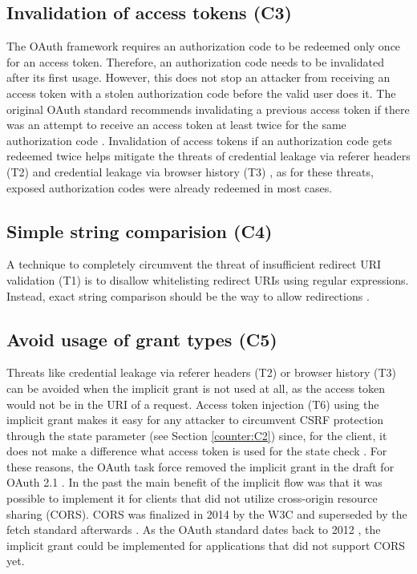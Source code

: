 \documentclass[
    fontsize=12pt,
    headings=small,
    parskip=half,           %
    bibliography=totoc,
    numbers=noenddot,       %
    open=any,               %
    ]{scrreprt}
\begin{document}
\subsection[Invalidation of access tokens]{Invalidation of access tokens (C3)}
\label{counter:C3}
The OAuth framework requires an authorization code to be redeemed only once for an access token. Therefore, an authorization code needs to be invalidated after its first usage. However, this does not stop an attacker from receiving an access token with a stolen authorization code before the valid user does it. The original OAuth standard recommends invalidating a previous access token if there was an attempt to receive an access token at least twice for the same authorization code \cite{hardt2012rfc}. Invalidation of access tokens if an authorization code gets redeemed twice helps mitigate the threats of credential leakage via referer headers (T2) and credential leakage via browser history (T3) \cite{lodderstedt2020oauth}, as for these threats, exposed authorization codes were already redeemed in most cases.

\subsection[Simple string comparision]{Simple string comparision (C4)}
\label{counter:C4}
A technique to completely circumvent the threat of insufficient redirect URI validation (T1) is to disallow whitelisting redirect URIs using regular expressions. Instead, exact string comparison should be the way to allow redirections \cite{lodderstedt2020oauth}.

\subsection[Avoid usage of grant types]{Avoid usage of grant types (C5)}
\label{counter:C5}
Threats like credential leakage via referer headers (T2) or browser history (T3) can be avoided when the implicit grant is not used at all, as the access token would not be in the URI of a request. Access token injection (T6) using the implicit grant makes it easy for any attacker to circumvent CSRF protection through the state parameter (see Section \ref{counter:C2}) since, for the client, it does not make a difference what access token is used for the state check \cite{lodderstedt2020oauth}. For these reasons, the OAuth task force removed the implicit grant in the draft for OAuth 2.1 \cite{hardt2023rfc}. In the past the main benefit of the implicit flow was that it was possible to implement it for clients that did not utilize cross-origin resource sharing (CORS). CORS was finalized in 2014 by the W3C and superseded by the fetch standard afterwards \cite{vanKesteren2014}. As the OAuth standard dates back to 2012 \cite{hardt2012rfc}, the implicit grant could be implemented for applications that did not support CORS yet.
\end{document}
